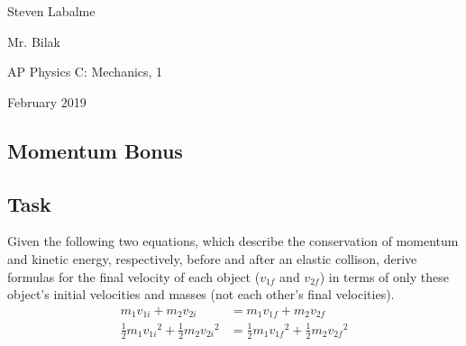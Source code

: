 \documentclass{article}
\begin{document}
\pagestyle{fancy}
\fancyhf{}
\renewcommand{\headrulewidth}{0pt}

\noindent Steven Labalme\par
\noindent Mr. Bilak\par
\noindent AP Physics C: Mechanics, 1\par
{} February 2019\par

\begin{center}
\section{Momentum Bonus}
\end{center}

\subsection{Task}
Given the following two equations, which describe the conservation of momentum and kinetic energy, respectively, before and after an elastic collison, derive formulas for the final velocity of each object ($v_{1f}$ and $v_{2f}$) in terms of only these object's initial velocities and masses (not each other's final velocities).
\begin{align}
    m_1v_{1i}+m_2v_{2i} &= m_1v_{1f}+m_2v_{2f}\\
    \frac{1}{2}m_1{v_{1i}}^2+\frac{1}{2}m_2{v_{2i}}^2 &= \frac{1}{2}m_1{v_{1f}}^2+\frac{1}{2}m_2{v_{2f}}^2
\end{align}
\end{document}
